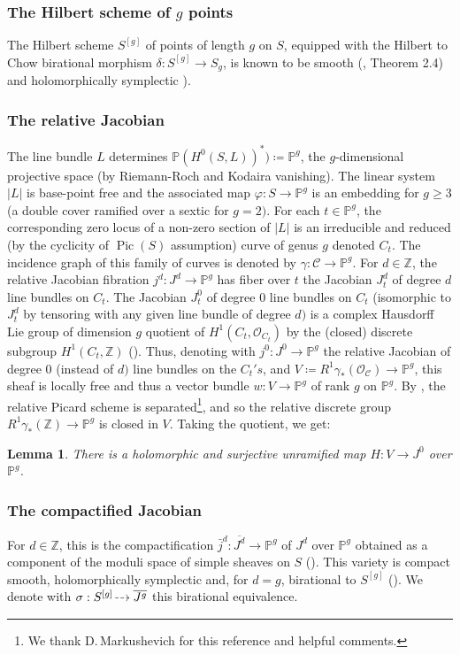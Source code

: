 \documentclass[JEP,XML,SOM,Unicode, NoEqCountersInSection,NoFloatCountersInSection,published]{cedram}
\let\mathcal\mathscr
\DeclareMathOperator{\Pic}{Pic}
\newcommand{\dradpl}{{\hspace*{-2.5mm}\begin{tikzcd}[ampersand replacement=\&,column sep = scriptsize]\mbox{}\ar[r,dashed]\&\mbox{}\end{tikzcd}\hspace*{-2.5mm}}}
\newcommand{\dratst}{{\hspace*{-2.5mm}\begin{tikzcd}[ampersand replacement=\&,column sep = small]\mbox{}\ar[r,dashed]\&\mbox{}\end{tikzcd}\hspace*{-2mm}}}
\let\drascst\dratst
\newcommand{\dra}{\mathchoice{\dradpl}{\dratst}{\drascst}{\drascst}}
\let\dasharrow\dra
\theoremstyle{theorem}
\newtheorem{lemma}[proposition]{Lemma}
\theoremstyle{definition}
\def\bP{{\mathbb P}}
\def\bZ{{\mathbb Z}}
\begin{document}
\subsubsection*{The Hilbert scheme of \(g\) points}
The Hilbert scheme $S^{[g]}$ of points of length $g$ on $S$, equipped with the Hilbert to Chow birational morphism $\delta:S^{[g]}\to S_{g}$, is known to be smooth (\cite{F}, Theorem 2.4) and holomorphically symplectic \cite{beauville1}).

\subsubsection*{The relative Jacobian}
The line bundle $L$ determines $\bP(H^0(S,L))^*)\coloneqq \bP^g$, the $g$\nobreakdash-dimensional projective space (by Riemann-Roch and Kodaira vanishing). The linear system $\vert L\vert$ is base-point free and the associated map $\varphi:S\to \bP^g$ is an embedding for $g\geq 3$ (a double cover ramified over a sextic for $g=2)$. For each $t\in \bP^g$, the corresponding zero locus of a non-zero section of $\vert L\vert$ is an irreducible and reduced (by the cyclicity of $\Pic(S)$ assumption) curve of genus $g$ denoted $C_t$. The incidence graph of this family of curves is denoted by $\gamma:\mathcal{C}\to \bP^g$. For $d\in \bZ$, the relative Jacobian fibration $j^d: J^d\to \bP^g$ has fiber over $t$ the Jacobian $J^d_t$ of degree $d$ line bundles on $C_t$. The Jacobian $J^0_t$ of degree $0$ line bundles on $C_t$ (isomorphic to $J^d_t$ by tensoring with any given line bundle of degree $d)$ is a complex Hausdorff Lie group of dimension $g$ quotient of $H^1(C_t,\mathcal{O}_{C_t})$ by the (closed) discrete subgroup $H^1(C_t,\bZ)$ (\cite[II.2, Prop.\,(2.)]{BPV}). Thus, denoting with $j^0:J^0\to \bP^g$ the relative Jacobian of degree $0$ (instead of $d)$ line bundles on the $C_t's$, and $V\coloneqq R^1\gamma_*(\mathcal{O}_{\mathcal{C}})\to \bP^g$, this sheaf is locally free and thus a vector bundle $w:V\to \bP^g$ of rank $g$ on $\bP^g$. By \cite[Th.\,3.1]{Gro}, the relative Picard scheme is separated\footnote{We thank D.\,Markushevich for this reference and helpful comments.}, and so the relative discrete group $R^1\gamma_*(\bZ)\to \bP^g$ is closed in $V$. Taking the quotient, we get:

\begin{lemma}\label{J^0} There is a holomorphic and surjective unramified map $H:V\to J^0$ over $\bP^g$.\end{lemma}

\subsubsection*{The compactified Jacobian}
For $d\in \bZ$, this is the compactification $\bar{j}^d:\overline{J^d}\to \bP^g$ of $J^d$ over $\bP^g$ obtained as a component of the moduli space of simple sheaves on $S$ (\cite{Mu}). This variety is compact smooth, holomorphically symplectic and, for $d=g$, birational to $S^{[g]}$ (\cite[Prop.\,3]{beauville2}). We denote with $\sigma: S^{[g]}\dasharrow \overline{J^g}$ this birational equivalence.
\end{document}
